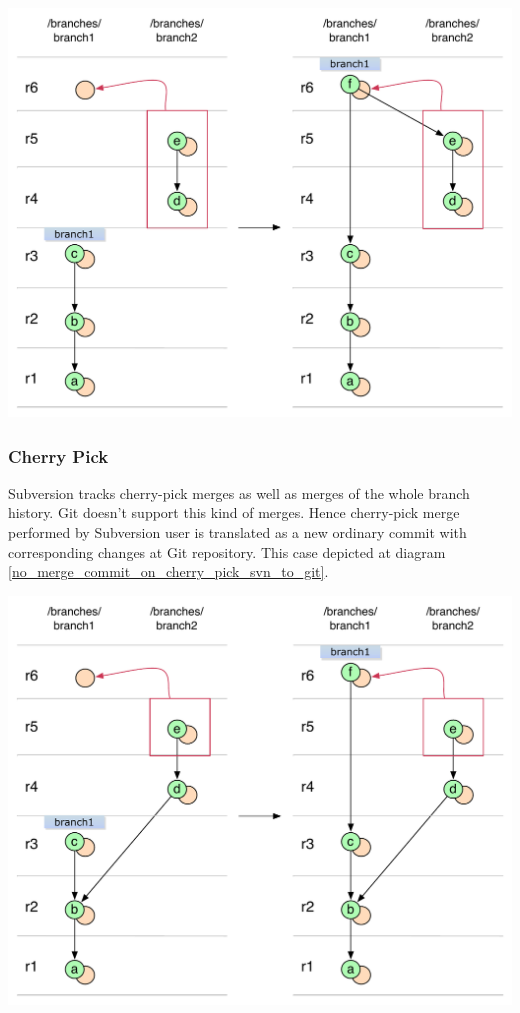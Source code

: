 \begin{center}
\includegraphics[width=\textwidth]{img/diagrams/simple_merge_branch_no_parent_svn_to_git.pdf}%
\label{simple_merge_branch_no_parent_svn_to_git}%
\end{center}

\subsubsection{Cherry Pick}

Subversion tracks cherry-pick merges as well as merges of the whole branch history. Git doesn't support this kind of merges. Hence cherry-pick merge performed by Subversion user is translated as a new ordinary commit with corresponding changes at Git repository. This case depicted at diagram \ref{no_merge_commit_on_cherry_pick_svn_to_git}.

\begin{center}
\includegraphics[width=\textwidth]{img/diagrams/no_merge_commit_on_cherry_pick_svn_to_git.pdf}%
\label{no_merge_commit_on_cherry_pick_svn_to_git}%
\end{center}

